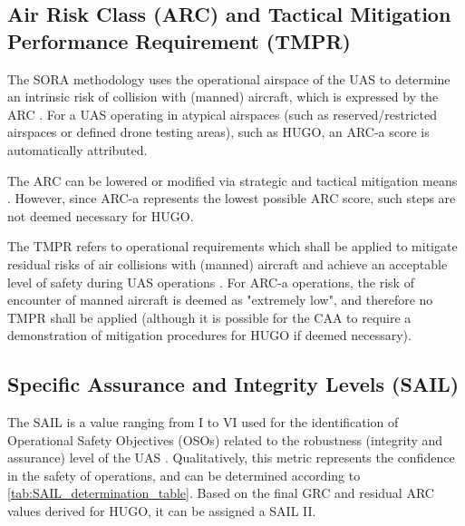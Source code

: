\subsection{Air Risk Class (ARC) and Tactical Mitigation Performance Requirement (TMPR)}
The SORA methodology uses the operational airspace of the UAS to determine an intrinsic risk of collision with (manned) aircraft, which is expressed by the ARC \cite{Jarus_main}. For a UAS operating in atypical airspaces (such as reserved/restricted airspaces or defined drone testing areas), such as HUGO, an ARC-a score is automatically attributed.

The ARC can be lowered or modified via strategic and tactical mitigation means \cite{Jarus_Annex_F}. However, since ARC-a represents the lowest possible ARC score, such steps are not deemed necessary for HUGO.

The TMPR refers to operational requirements which shall be applied to mitigate residual risks of air collisions with (manned) aircraft and achieve an acceptable level of safety during UAS operations \cite{Jarus_main}. For ARC-a operations, the risk of encounter of manned aircraft is deemed as "extremely low", and therefore no TMPR shall be applied (although it is possible for the CAA to require a demonstration of mitigation procedures for HUGO if deemed necessary)\cite{Jarus_Annex_A}\cite{Jarus_Annex_D}.


\subsection{Specific Assurance and Integrity Levels (SAIL)}
The SAIL is a value ranging from I to VI used for the identification of Operational Safety Objectives (OSOs) related to the robustness (integrity and assurance) level of the UAS \cite{Jarus_main}. Qualitatively, this metric represents the confidence in the safety of operations, and can be determined according to \autoref{tab:SAIL_determination_table}. Based on the final GRC and residual ARC values derived for HUGO, it can be assigned a SAIL II.

